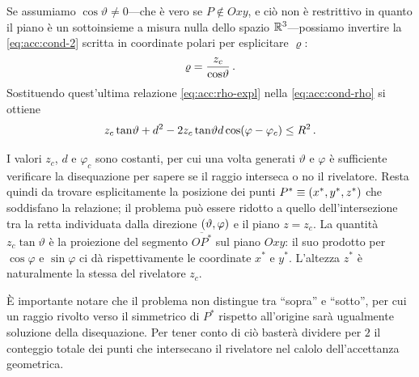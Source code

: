             Se assumiamo $\cos\!\vartheta \neq 0$---che è vero se $P \notin Oxy$, e ciò non è restrittivo in quanto il piano è un sottoinsieme a misura nulla dello spazio $\mathbb{R}^3$---possiamo invertire la \eqref{eq:acc:cond-2} scritta in coordinate polari per esplicitare $\varrho$:
            \begin{equation}
                \varrho = \frac{z_c}{\cos\!\vartheta}
                \,.
                \label{eq:acc:rho-expl}
            \end{equation}
            Sostituendo quest'ultima relazione \eqref{eq:acc:rho-expl} nella \eqref{eq:acc:cond-rho} si ottiene
            \begin{equation}
                z_c \tan\!\vartheta + d^2 - 2 z_c \tan\!\vartheta d \cos\!\pqty{\varphi - \varphi_c} \leq R^2
                \myperiod
                \label{eq:acc:diseq}
            \end{equation}

            I valori $z_c$, $d$ e $\varphi_c$ sono costanti, per cui una volta generati $\vartheta$ e $\varphi$ è sufficiente verificare la disequazione per sapere se il raggio interseca o no il rivelatore. Resta quindi da trovare esplicitamente la posizione dei punti $P^*\equiv\pqty{x^*, y^*, z^*}$ che soddisfano la relazione; il problema può essere ridotto a quello dell'intersezione tra la retta individuata dalla direzione $\pqty{\vartheta,\varphi}$ e il piano $z = z_c$. La quantità $z_c \tan\!\vartheta$ è la proiezione del segmento $\overline{OP^*}$ sul piano $Oxy$: il suo prodotto per $\cos\!\varphi$ e $\sin\!\varphi$ ci dà rispettivamente le coordinate $x^*$ e $y^*$. L'altezza $z^*$ è naturalmente la stessa del rivelatore $z_c$.
            
            È importante notare che il problema non distingue tra ``sopra'' e ``sotto'', per cui un raggio rivolto verso il simmetrico di $P^*$ rispetto all'origine sarà ugualmente soluzione della disequazione. Per tener conto di ciò basterà dividere per $2$ il conteggio totale dei punti che intersecano il rivelatore nel calolo dell'accettanza geometrica.

